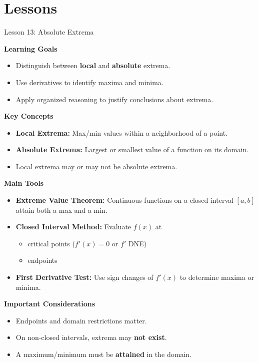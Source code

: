 \documentclass[dvipsnames]{beamer}
\newcommand{\transition}[1]{\frame{{}\begin{center}\fbox{#1}\end{center}}}
\begin{document}
\section{Lessons}
\transition{Lessons}



\begin{frame}{Lesson 13: Absolute Extrema}

\textbf{Learning Goals}
\begin{itemize}
\item Distinguish between \textbf{local} and \textbf{absolute} extrema.
\item Use derivatives to identify maxima and minima.
\item Apply organized reasoning to justify conclusions about extrema.
\end{itemize}

\textbf{Key Concepts}
\begin{itemize}
\item \textbf{Local Extrema:} Max/min values within a neighborhood of a point.
\item \textbf{Absolute Extrema:} Largest or smallest value of a function on its domain.
\item Local extrema may or may not be absolute extrema.
\end{itemize}
\end{frame}

\begin{frame}
\textbf{Main Tools}
\begin{itemize}
\item \textbf{Extreme Value Theorem:}  
Continuous functions on a closed interval $[a,b]$ attain both a max and a min.
\item \textbf{Closed Interval Method:}  
Evaluate $f(x)$ at
\begin{itemize}
\item critical points ($f'(x)=0$ or $f'$ DNE)
\item endpoints
\end{itemize}
\item \textbf{First Derivative Test:}  
Use sign changes of $f'(x)$ to determine maxima or minima.
\end{itemize}

\textbf{Important Considerations}
\begin{itemize}
\item Endpoints and domain restrictions matter.
\item On non-closed intervals, extrema may \textbf{not exist}.
\item A maximum/minimum must be \textbf{attained} in the domain.
\end{itemize}

\end{frame}
\end{document}
